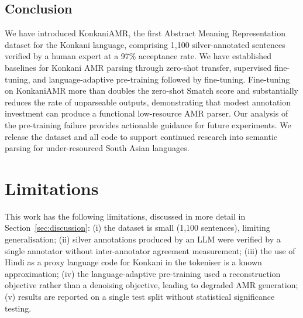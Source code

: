 \subsection{Conclusion}

We have introduced KonkaniAMR, the first Abstract Meaning Representation dataset for the Konkani language, comprising 1,100 silver-annotated sentences verified by a human expert at a 97\% acceptance rate. We have established baselines for Konkani AMR parsing through zero-shot transfer, supervised fine-tuning, and language-adaptive pre-training followed by fine-tuning. Fine-tuning on KonkaniAMR more than doubles the zero-shot Smatch score and substantially reduces the rate of unparseable outputs, demonstrating that modest annotation investment can produce a functional low-resource AMR parser. Our analysis of the pre-training failure provides actionable guidance for future experiments. We release the dataset and all code to support continued research into semantic parsing for under-resourced South Asian languages.

\section*{Limitations}
\label{sec:limitations}

This work has the following limitations, discussed in more detail in Section~\ref{sec:discussion}: (i) the dataset is small (1,100 sentences), limiting generalisation; (ii) silver annotations produced by an LLM were verified by a single annotator without inter-annotator agreement measurement; (iii) the use of Hindi as a proxy language code for Konkani in the tokeniser is a known approximation; (iv) the language-adaptive pre-training used a reconstruction objective rather than a denoising objective, leading to degraded AMR generation; (v) results are reported on a single test split without statistical significance testing.
